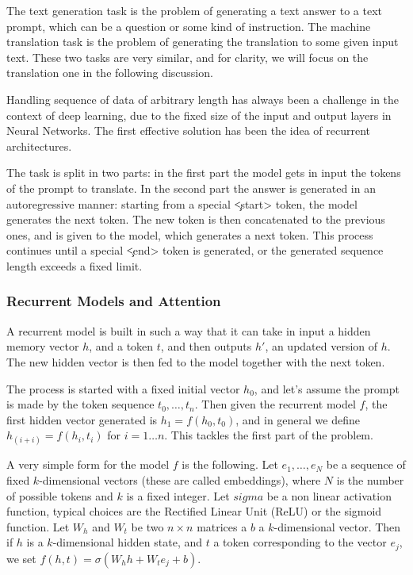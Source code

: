 \documentclass[]{marticle}
\begin{document}
The text generation task is the problem of generating a text answer to a text prompt, which can be a
question or some kind of instruction. The machine translation task is the problem of generating the
translation to some given input text. These two tasks are very similar, and for clarity, we will
focus on the translation one  in the following discussion.

Handling sequence of data of arbitrary length has always been a challenge in the context of deep
learning, due to the fixed size of the input and output layers in Neural Networks. The first
effective solution has been the idea of recurrent architectures.

The task is split in two parts: in the first part the model gets in input the tokens of the prompt
to translate. In the second part the answer is generated in an autoregressive manner: starting from
a special \c{<start>} token, the model generates the next token. The new token is then concatenated to
the previous ones, and is given to the model, which generates a next token. This process continues
until a special \c{<end>} token is generated, or the generated sequence length exceeds a fixed limit.

\subsubsection{Recurrent Models and Attention}

A recurrent model is built in such a way that it can take in input a hidden memory vector $h$, and a
token $t$, and then outputs $h'$, an updated version of $h$. The new hidden vector is then fed to
the model together with the next token.

The process is started with a fixed initial vector $h_0$, and let's assume the prompt is made by the
token sequence $t_0, \dots, t_n$. Then given the recurrent model $f$, the first hidden vector
generated is $h_1 = f(h_0, t_0)$, and in general we define $h_(i+i) = f(h_i, t_i)$ for $i=1\dots n$.
This tackles the first part of the problem. 

A very simple form for the model $f$ is the following. Let $e_1, \dots, e_N$ be a sequence of fixed
$k$-dimensional vectors (these are called embeddings), where $N$ is the number of possible tokens
and $k$ is a fixed integer. Let $sigma$ be a non linear activation function, typical choices are the
Rectified Linear Unit (ReLU) or the sigmoid function. Let $W_h$ and $W_t$ be two $n \times n$
matrices a $b$ a $k$-dimensional vector. Then if $h$ is a $k$-dimensional hidden state, and $t$ a
token corresponding to the vector $e_j$, we set $f(h,t) = \sigma(W_h h + W_t e_j + b)$.
\end{document}
